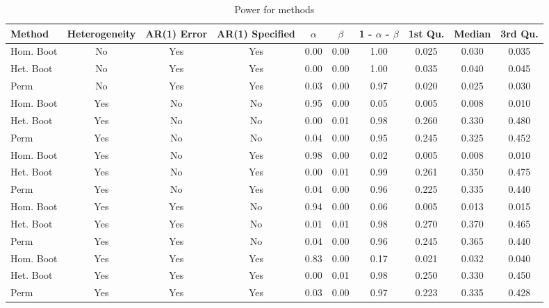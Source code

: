 \documentclass{article}
\begin{document}
\begin{landscape}
\begin{table}[ht]
\centering
\begin{tabular}{lccccccccc}
  \hline
Method & Heterogeneity & AR(1) Error & AR(1) Specified & $\alpha$ & $\beta$ & 1 - $\alpha$ - $\beta$ & 1st Qu. & Median & 3rd Qu.  \\ 
  \hline
Hom. Boot & No & Yes & Yes & 0.00 & 0.00 & 1.00 & 0.025 & 0.030 & 0.035 \\ 
  Het. Boot & No & Yes & Yes & 0.00 & 0.00 & 1.00 & 0.035 & 0.040 & 0.045 \\ 
  Perm & No & Yes & Yes & 0.03 & 0.00 & 0.97 & 0.020 & 0.025 & 0.030 \\ \hline
  Hom. Boot & Yes & No & No & 0.95 & 0.00 & 0.05 & 0.005 & 0.008 & 0.010 \\ 
  Het. Boot & Yes & No & No & 0.00 & 0.01 & 0.98 & 0.260 & 0.330 & 0.480 \\ 
  Perm & Yes & No & No & 0.04 & 0.00 & 0.95 & 0.245 & 0.325 & 0.452 \\ \hline
  Hom. Boot & Yes & No & Yes & 0.98 & 0.00 & 0.02 & 0.005 & 0.008 & 0.010 \\ 
  Het. Boot & Yes & No & Yes & 0.00 & 0.01 & 0.99 & 0.261 & 0.350 & 0.475 \\ 
  Perm & Yes & No & Yes & 0.04 & 0.00 & 0.96 & 0.225 & 0.335 & 0.440 \\ \hline
  Hom. Boot & Yes & Yes & No & 0.94 & 0.00 & 0.06 & 0.005 & 0.013 & 0.015 \\ 
  Het. Boot & Yes & Yes & No & 0.01 & 0.01 & 0.98 & 0.270 & 0.370 & 0.465 \\ 
  Perm & Yes & Yes & No & 0.04 & 0.00 & 0.96 & 0.245 & 0.365 & 0.440 \\ \hline
  Hom. Boot & Yes & Yes & Yes & 0.83 & 0.00 & 0.17 & 0.021 & 0.032 & 0.040 \\ 
  Het. Boot & Yes & Yes & Yes & 0.00 & 0.01 & 0.98 & 0.250 & 0.330 & 0.450 \\ 
  Perm & Yes & Yes & Yes & 0.03 & 0.00 & 0.97 & 0.223 & 0.335 & 0.428 \\ 
   \hline
\end{tabular}
\caption{Power for methods} 
\label{tab:power_methods_full}
\end{table}
\end{landscape}
\end{document}
